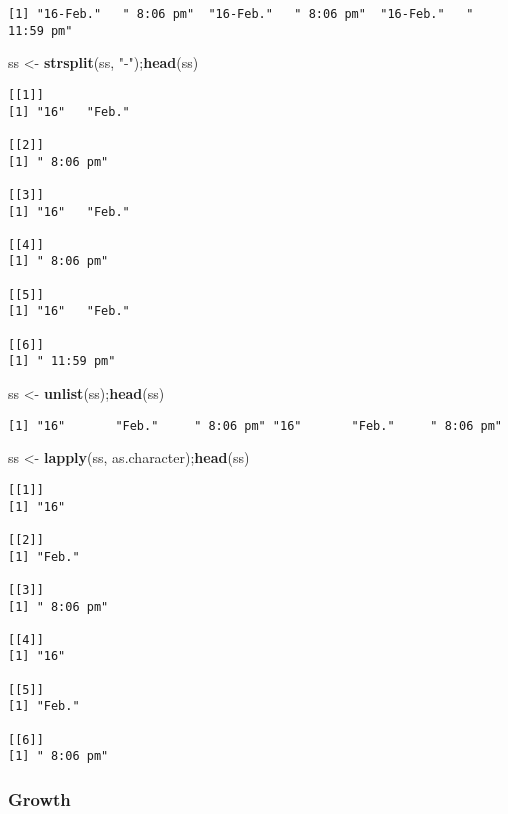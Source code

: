 \documentclass[10,portrait]{article}
\newenvironment{Shaded}{\begin{snugshade}}{\end{snugshade}}
\newcommand{\KeywordTok}[1]{\textcolor[rgb]{0.13,0.29,0.53}{\textbf{#1}}}
\newcommand{\StringTok}[1]{\textcolor[rgb]{0.31,0.60,0.02}{#1}}
\newcommand{\NormalTok}[1]{#1}
\begin{document}
\begin{verbatim}
[1] "16-Feb."   " 8:06 pm"  "16-Feb."   " 8:06 pm"  "16-Feb."   " 11:59 pm"
\end{verbatim}

\begin{Shaded}
\begin{Highlighting}[]
\NormalTok{ss <-}\StringTok{ }\KeywordTok{strsplit}\NormalTok{(ss, }\StringTok{"-"}\NormalTok{);}\KeywordTok{head}\NormalTok{(ss)}
\end{Highlighting}
\end{Shaded}

\begin{verbatim}
[[1]]
[1] "16"   "Feb."

[[2]]
[1] " 8:06 pm"

[[3]]
[1] "16"   "Feb."

[[4]]
[1] " 8:06 pm"

[[5]]
[1] "16"   "Feb."

[[6]]
[1] " 11:59 pm"
\end{verbatim}

\begin{Shaded}
\begin{Highlighting}[]
\NormalTok{ss <-}\StringTok{ }\KeywordTok{unlist}\NormalTok{(ss);}\KeywordTok{head}\NormalTok{(ss)}
\end{Highlighting}
\end{Shaded}

\begin{verbatim}
[1] "16"       "Feb."     " 8:06 pm" "16"       "Feb."     " 8:06 pm"
\end{verbatim}

\begin{Shaded}
\begin{Highlighting}[]
\NormalTok{ss <-}\StringTok{ }\KeywordTok{lapply}\NormalTok{(ss, as.character);}\KeywordTok{head}\NormalTok{(ss)}
\end{Highlighting}
\end{Shaded}

\begin{verbatim}
[[1]]
[1] "16"

[[2]]
[1] "Feb."

[[3]]
[1] " 8:06 pm"

[[4]]
[1] "16"

[[5]]
[1] "Feb."

[[6]]
[1] " 8:06 pm"
\end{verbatim}

\subsubsection{Growth}\label{growth}
\end{document}
